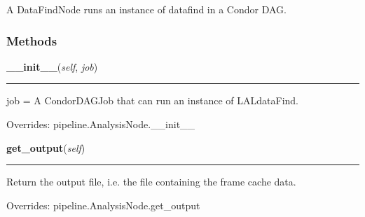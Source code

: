 A DataFindNode runs an instance of datafind in a Condor DAG.



  \subsubsection{Methods}

    \label{inspiral:DataFindNode:__init__}
    \vspace{0.5ex}

    \noindent\begin{boxedminipage}{\textwidth}

    \raggedright \textbf{\_\_init\_\_}(\textit{self}, \textit{job})

    \vspace{-1.5ex}

    \rule{\textwidth}{0.5\fboxrule}
    job = A CondorDAGJob that can run an instance of LALdataFind.

    \vspace{1ex}

      Overrides: pipeline.AnalysisNode.\_\_init\_\_

    \end{boxedminipage}

    \label{inspiral:DataFindNode:get_output}
    \vspace{0.5ex}

    \noindent\begin{boxedminipage}{\textwidth}

    \raggedright \textbf{get\_output}(\textit{self})

    \vspace{-1.5ex}

    \rule{\textwidth}{0.5\fboxrule}
    Return the output file, i.e. the file containing the frame cache 
    data.

    \vspace{1ex}

      Overrides: pipeline.AnalysisNode.get\_output

    \end{boxedminipage}

